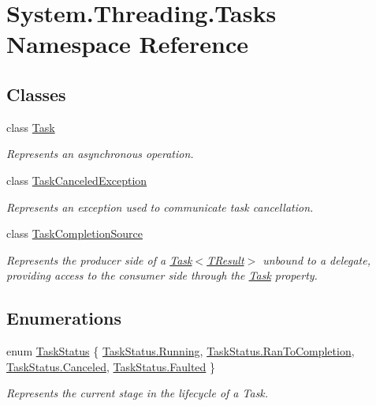 \hypertarget{namespace_system_1_1_threading_1_1_tasks}{}\section{System.\+Threading.\+Tasks Namespace Reference}
\label{namespace_system_1_1_threading_1_1_tasks}
\subsection*{Classes}
\begin{DoxyCompactItemize}
\item 
class \hyperlink{class_system_1_1_threading_1_1_tasks_1_1_task}{Task}
\begin{DoxyCompactList}\small\item\em Represents an asynchronous operation. \end{DoxyCompactList}\item 
class \hyperlink{class_system_1_1_threading_1_1_tasks_1_1_task_canceled_exception}{Task\+Canceled\+Exception}
\begin{DoxyCompactList}\small\item\em Represents an exception used to communicate task cancellation. \end{DoxyCompactList}\item 
class \hyperlink{class_system_1_1_threading_1_1_tasks_1_1_task_completion_source}{Task\+Completion\+Source}
\begin{DoxyCompactList}\small\item\em Represents the producer side of a \hyperlink{class_system_1_1_threading_1_1_tasks_1_1_task}{Task$<$\+T\+Result$>$} unbound to a delegate, providing access to the consumer side through the \hyperlink{class_system_1_1_threading_1_1_tasks_1_1_task}{Task} property. \end{DoxyCompactList}\end{DoxyCompactItemize}
\subsection*{Enumerations}
\begin{DoxyCompactItemize}
\item 
enum \hyperlink{namespace_system_1_1_threading_1_1_tasks_a60ab70a6c84627853d6b1056f1edebcf}{Task\+Status} \{ \hyperlink{namespace_system_1_1_threading_1_1_tasks_a60ab70a6c84627853d6b1056f1edebcfa5bda814c4aedb126839228f1a3d92f09}{Task\+Status.\+Running}, 
\hyperlink{namespace_system_1_1_threading_1_1_tasks_a60ab70a6c84627853d6b1056f1edebcfaafe3c20f08a3dd6c4cab23d979c8f1e9}{Task\+Status.\+Ran\+To\+Completion}, 
\hyperlink{namespace_system_1_1_threading_1_1_tasks_a60ab70a6c84627853d6b1056f1edebcfa0e22fe7d45f8e5632a4abf369b24e29c}{Task\+Status.\+Canceled}, 
\hyperlink{namespace_system_1_1_threading_1_1_tasks_a60ab70a6c84627853d6b1056f1edebcfa2b310d05c23325e2935ec87b25a60b8f}{Task\+Status.\+Faulted}
 \}\begin{DoxyCompactList}\small\item\em Represents the current stage in the lifecycle of a Task. \end{DoxyCompactList}
\end{DoxyCompactItemize}


